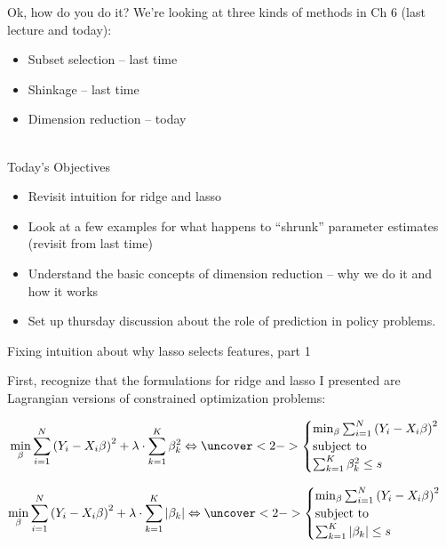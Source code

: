 \documentclass[mathserif]{beamer}
\begin{document}
\begin{frame}{Ok, how do you do it?}
We're looking at three kinds of methods in Ch 6 (last lecture and today):
\begin{itemize}
\item Subset selection -- last time
\item Shinkage -- last time
\item Dimension reduction -- today\\~\\
\end{itemize}

{\large \color{blue} Today's Objectives}
\begin{itemize}
\item Revisit intuition for ridge and lasso
\item Look at a few examples for what happens to ``shrunk'' parameter estimates (revisit from last time)
\item Understand the basic concepts of dimension reduction -- why we do it and how it works
\item Set up thursday discussion about the role of prediction in policy problems.
\end{itemize}
\end{frame}

\begin{frame}{Fixing intuition about why lasso selects features, part 1}

First, recognize that the formulations for ridge and lasso I presented are Lagrangian versions of constrained optimization problems:

\begin{align*}
\min_\beta \sum_{i=1}^N \left(Y_i - X_i \beta \right)^2+\lambda \cdot \sum_{k=1}^K \beta_k^2 
\Leftrightarrow
\uncover<2->{\begin{cases}
\min_\beta \sum_{i=1}^N \left(Y_i - X_i \beta \right)^2\\
\text{subject to}\\
\sum_{k=1}^K \beta_k^2 \le s
\end{cases}}
\end{align*}

\begin{align*}
\min_\beta \sum_{i=1}^N \left(Y_i - X_i \beta \right)^2+\lambda \cdot \sum_{k=1}^K |\beta_k|
\Leftrightarrow
\uncover<2->{\begin{cases}
\min_\beta \sum_{i=1}^N \left(Y_i - X_i \beta \right)^2\\
\text{subject to}\\
\sum_{k=1}^K |\beta_k | \le s
\end{cases}}
\end{align*}

\end{frame}
\end{document}
